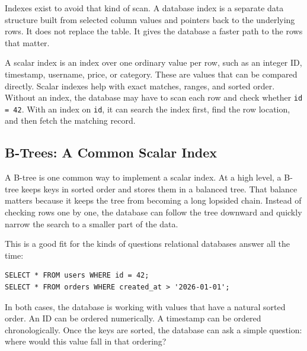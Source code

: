 \documentclass[12pt]{article}
\begin{document}
Indexes exist to avoid that kind of scan. A database index is a separate
data structure built from selected column values and pointers back to the
underlying rows. It does not replace the table. It gives the database a
faster path to the rows that matter.

A scalar index is an index over one ordinary value per row, such as an
integer ID, timestamp, username, price, or category. These are values that
can be compared directly. Scalar indexes help with exact matches, ranges,
and sorted order. Without an index, the database may have to scan each row
and check whether \texttt{id = 42}. With an index on \texttt{id}, it can
search the index first, find the row location, and then fetch the matching
record.

\subsection{B-Trees: A Common Scalar Index}

A B-tree is one common way to implement a scalar index. At a high level,
a B-tree keeps keys in sorted order and stores them in a balanced tree.
That balance matters because it keeps the tree from becoming a long
lopsided chain. Instead of checking rows one by one, the database can
follow the tree downward and quickly narrow the search to a smaller part
of the data.

This is a good fit for the kinds of questions relational databases answer
all the time:

\begin{verbatim}
SELECT * FROM users WHERE id = 42;
SELECT * FROM orders WHERE created_at > '2026-01-01';
\end{verbatim}

In both cases, the database is working with values that have a natural
sorted order. An ID can be ordered numerically. A timestamp can be ordered
chronologically. Once the keys are sorted, the database can ask a simple
question: where would this value fall in that ordering?
\end{document}
